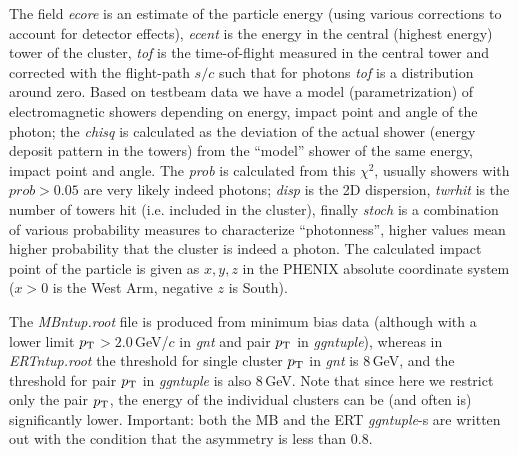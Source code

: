 \documentclass[12pt,letterpaper,aps,prc,superscriptaddress,showpacs,
longbibliography,nofootinbib,floatfix,onecolumn]{revtex4-1}
\newcommand{\pt}{\mbox{$p_{\rm T}$}\xspace}
\newcommand{\gev}{\mbox{GeV}\xspace}
\newcommand{\gevc}{\mbox{GeV/$c$}\xspace}
\begin{document}
\noindent
The field {\it ecore} is an estimate of the particle energy (using various
corrections to account for detector effects), {\it ecent} is the
energy in the central (highest energy) tower of the cluster, 
{\it tof} is the time-of-flight measured in the central tower and
corrected with the flight-path $s/c$ such that for photons {\it tof}
is a distribution around zero.  Based on testbeam data we have a model
(parametrization) of electromagnetic showers depending on energy, impact
point and angle of the photon; the {\it chisq} is calculated as the
deviation of the actual shower (energy deposit pattern in the towers)
from the ``model'' shower of the same energy, impact point and angle.
The {\it prob} is calculated from this $\chi^2$, usually showers with
$prob>0.05$ are very likely indeed photons;  {\it disp} is the 2D
dispersion, {\it twrhit} is the number of towers hit (i.e. included in
the cluster), finally {\it stoch} is a combination of various
probability measures to characterize ``photonness'', higher values
mean higher probability that the cluster is indeed a photon.  The
calculated impact point of the particle is given as $x,y,z$ in the
PHENIX absolute coordinate system ($x>0$ is the West Arm, negative $z$
is South).

The {\it MBntup.root} file is produced from minimum bias data (although
with a lower limit  \pt$>2.0$\,\gevc in {\it gnt} and pair \pt in
{\it ggntuple}), whereas in {\it ERTntup.root} the threshold for 
single cluster \pt in {\it gnt} is 8\,\gev, and the threshold for pair
\pt in {\it ggntuple} is also 8\,\gev.  Note that since here we
restrict only the pair \pt, the energy of the individual clusters can
be (and often is) significantly lower.  Important: both the MB and the
ERT {\it ggntuple}-s are written out with the condition that the
asymmetry is less than 0.8.
\end{document}
